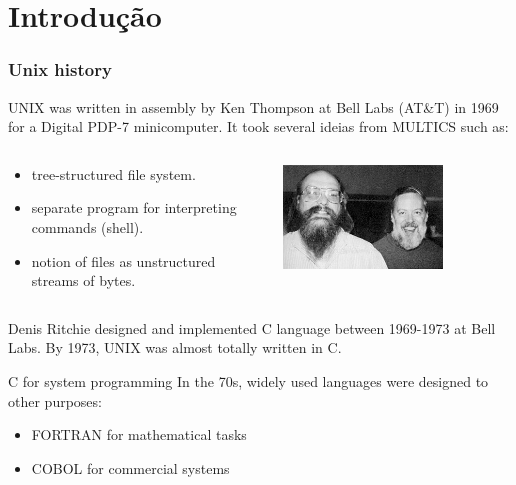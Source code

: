\documentclass[xcolor={usenames,dvipsnames},10pt,presentation,aspectratio=169]{beamer}
\begin{document}
\section{Introdução}
\begin{frame}
  \frametitle{Unix history}
UNIX was written in assembly by Ken Thompson at Bell Labs (AT\&T) in
1969 for a Digital PDP-7 minicomputer. It took several ideias from
MULTICS such as:
\begin{columns}\begin{column}{0.7\textwidth}
  \begin{itemize}
    \item tree-structured file system.
    \item separate program for interpreting commands (shell).
    \item notion of files as unstructured streams of bytes.
  \end{itemize}
\end{column}\begin{column}{0.3\textwidth}
\begin{center}
  \includegraphics[width=0.7\textwidth]{ken_denis}
\end{center}
\end{column}\end{columns}

Denis Ritchie designed and implemented C language between 1969-1973
at Bell Labs. By 1973, UNIX was almost totally written in C.
\begin{block}{C for system programming}
In the 70s, widely used languages were designed to other purposes:
  \begin{itemize}
    \item FORTRAN for mathematical tasks
    \item COBOL for commercial systems 
  \end{itemize}
\end{block}
\end{frame}
\end{document}
